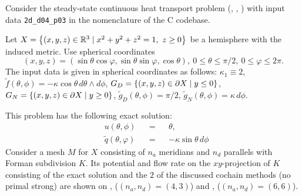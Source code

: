 \begin{example}
  \label{cmc/diffusion/continuous/steady_state/examples/2d_d04_p03-example}
  Consider the steady-state continuous heat transport problem
  (,
   ,
   )
  with input data \verb|2d_d04_p03| in the nomenclature of the C codebase.

  Let $X = \left\{ (x, y, z) \in \mathbb{R}^3 \mid x^2 + y^2 + z^2 = 1,\ z \geq 0 \right\}$ be a
  hemisphere with the induced metric.
  Use spherical coordinates
  \begin{equation}
    (x, y, z)
    = (\sin \theta \cos \varphi, \sin \theta \sin \varphi, \cos \theta),\
    0 \leq \theta \leq \pi / 2,\
    0 \leq \varphi \leq 2 \pi.
  \end{equation}
  The input data is given in spherical coordinates as follows:
    $\kappa_1 \equiv 2$,
    $\tilde{f}(\theta, \phi) = - \kappa \cos \theta\, d \theta \wedge d \phi$,
    $G_D = \left\{ (x, y, z) \in \partial X \mid y \leq 0 \right\}$,
    $G_N = \left\{ (x, y, z) \in \partial X \mid y \geq 0 \right\}$,
    $\tilde{g}_D(\theta, \phi) = \pi / 2$,
    $\tilde{g}_N(\theta, \phi) = \kappa\, d \phi$.

  This problem has the following exact solution:
  \begin{subequations}
    \begin{alignat}{3}
      & u(\theta, \phi) && = && \theta, \\
      & \tilde{q}(\theta, \varphi) && = && - \kappa \sin \theta\, d \phi
    \end{alignat}
  \end{subequations}
  Consider a mesh $M$ for $X$ consisting of $n_a$ meridians and $n_d$ parallels
  with Forman subdivision $K$.
  Its potential and flow rate on the $xy$-projection of $K$ consisting of the
  exact solution and the $2$ of the discussed cochain methods (no primal strong)
  are shown on
  ,
  ($(n_a, n_d) = (4, 3)$)
  and
  ,
  ($(n_a, n_d) = (6, 6)$).
\end{example}
